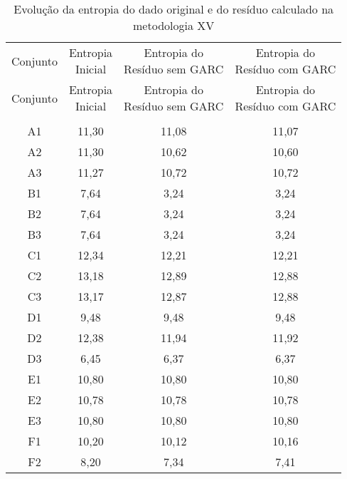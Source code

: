 \begin{center}
\begin{longtable}{cccc}
\toprule
\rowcolor{white}
\caption[Metodologia XV: evolução da entropia]{Evolução da entropia do dado
original e do resíduo calculado na metodologia XV}
\label{tab:EvolucaoEntropiaMet15}\\
\midrule
Conjunto & \specialcell{Entropia \\Inicial} & \specialcell{Entropia do
\\Resíduo sem GARC} & \specialcell{Entropia do
\\Resíduo com GARC}  \\
\midrule
\endfirsthead
\midrule
\rowcolor{white}
Conjunto & \specialcell{Entropia \\Inicial} & \specialcell{Entropia do
\\Resíduo sem GARC} & \specialcell{Entropia do
\\Resíduo com GARC}  \\
\toprule
\endhead
\midrule \\ %
\endfoot
\bottomrule 
\endlastfoot
    A1    & 11,30 & 11,08 & 11,07 \\
    A2    & 11,30 & 10,62 & 10,60 \\
    A3    & 11,27 & 10,72 & 10,72 \\
    B1    & 7,64  & 3,24  & 3,24 \\
    B2    & 7,64  & 3,24  & 3,24 \\
    B3    & 7,64  & 3,24  & 3,24 \\
    C1    & 12,34 & 12,21 & 12,21 \\
    C2    & 13,18 & 12,89 & 12,88 \\
    C3    & 13,17 & 12,87 & 12,88 \\
    D1    & 9,48  & 9,48  & 9,48 \\
    D2    & 12,38 & 11,94 & 11,92 \\
    D3    & 6,45  & 6,37  & 6,37 \\
    E1    & 10,80 & 10,80 & 10,80 \\
    E2    & 10,78 & 10,78 & 10,78 \\
    E3    & 10,80 & 10,80 & 10,80 \\
    F1    & 10,20 & 10,12 & 10,16 \\
    F2    & 8,20  & 7,34  & 7,41 \\

\end{longtable}
\end{center}
